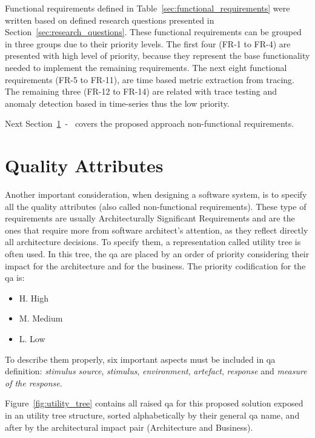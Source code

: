 Functional requirements defined in Table~\ref{sec:functional_requirements} were written based on defined research questions presented in Section~\ref{sec:research_questions}. These functional requirements can be grouped in three groups due to their priority levels. The first four (FR-1 to FR-4) are presented with high level of priority, because they represent the base functionality needed to implement the remaining requirements. The next eight functional requirements (FR-5 to FR-11), are time based metric extraction from tracing. The remaining three (FR-12 to FR-14) are related with trace testing and anomaly detection based in time-series thus the low priority.

Next Section~\ref{sec:quality_attributes}~-~ covers the proposed approach non-functional requirements.

\section{Quality Attributes}
\label{sec:quality_attributes}

Another important consideration, when designing a software system, is to specify all the quality attributes (also called non-functional requirements). These type of requirements are usually Architecturally Significant Requirements and are the ones that require more from software architect's attention, as they reflect directly all architecture decisions. To specify them, a representation called utility tree is often used. In this tree, the \gls{qa} are placed by an order of priority considering their impact for the architecture and for the business. The priority codification for the \gls{qa} is:

\begin{itemize}
    \item H. High
    \item M. Medium
    \item L. Low
\end{itemize}

To describe them properly, six important aspects must be included in \gls{qa} definition: \emph{stimulus source}, \emph{stimulus}, \emph{environment}, \emph{artefact}, \emph{response} and \emph{measure of the response}.

Figure~\ref{fig:utility_tree} contains all raised \gls{qa} for this proposed solution exposed in an utility tree structure, sorted alphabetically by their general \gls{qa} name, and after by the architectural impact pair (Architecture and Business).

